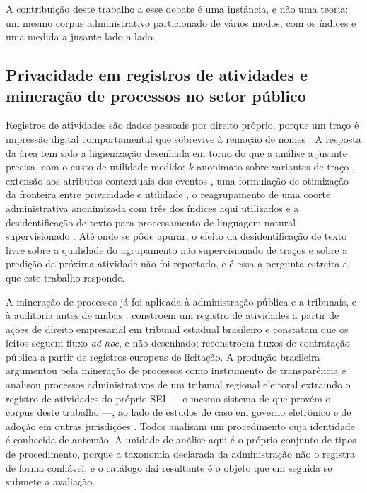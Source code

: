 A contribuição deste trabalho a esse debate é uma instância, e não uma teoria: um mesmo corpus
administrativo particionado de vários modos, com os índices e uma medida a jusante lado a lado.

\subsection{Privacidade em registros de atividades e mineração de processos no setor público}
\label{sec:rev-privacidade}

Registros de atividades são dados pessoais por direito próprio, porque um traço é impressão digital
comportamental que sobrevive à remoção de nomes \cite{mannhardt2019privacy,elkoumy2022privacy}. A
resposta da área tem sido a higienização desenhada em torno do que a análise a jusante precisa, com
o custo de utilidade medido: $k$-anonimato sobre variantes de traço
\cite{fahrenkrogpetersen2019pretsa}, extensão aos atributos contextuais dos eventos
\cite{fahrenkrogpetersen2020pripel}, uma formulação de otimização da fronteira entre privacidade e
utilidade \cite{fahrenkrogpetersen2023optimal}, o reagrupamento de uma coorte administrativa
anonimizada com três dos índices aqui utilizados \cite{ferrao2022utility} e a desidentificação de
texto para processamento de linguagem natural supervisionado \cite{lothritz2023evaluating}. Até onde
se pôde apurar, o efeito da desidentificação de texto livre sobre a qualidade do agrupamento não
supervisionado de traços e sobre a predição da próxima atividade não foi reportado, e é essa a
pergunta estreita a que este trabalho responde.

A mineração de processos já foi aplicada à administração pública e a tribunais, e à auditoria antes
de ambas \cite{vanderaalst2010auditing,jans2014fieldstudy}. 
constroem um registro de atividades a partir de ações de direito empresarial em tribunal estadual brasileiro e
constatam que os feitos seguem fluxo \emph{ad hoc}, e não desenhado;
 reconstroem fluxos de contratação pública a partir de registros
europeus de licitação. A produção brasileira argumentou pela mineração de processos como instrumento
de transparência \cite{araujo2023mineracao} e analisou processos administrativos de um tribunal
regional eleitoral extraindo o registro de atividades do próprio SEI \cite{limaesilva2026analise} --- o mesmo sistema
de que provém o corpus deste trabalho ---, ao lado de estudos de caso em governo eletrônico e de
adoção em outras jurisdições \cite{delgado2022discovery,racis2025donot,trottier2025using}. Todos
analisam um procedimento cuja identidade é conhecida de antemão. A unidade de análise aqui é o
próprio conjunto de tipos de procedimento, porque a taxonomia declarada da administração não o
registra de forma confiável, e o catálogo daí resultante é o objeto que em seguida se submete a
avaliação.
